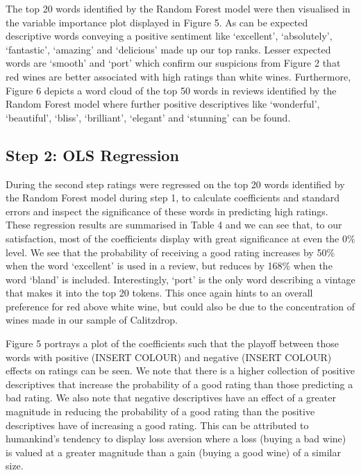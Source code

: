 \documentclass[11pt,preprint]{elsarticle}
\numberwithin{equation}{section}
\numberwithin{figure}{section}
\numberwithin{table}{section}
\begin{document}
The top 20 words identified by the Random Forest model were then
visualised in the variable importance plot displayed in Figure 5. As can
be expected descriptive words conveying a positive sentiment like
`excellent', `absolutely', `fantastic', `amazing' and `delicious' made
up our top ranks. Lesser expected words are `smooth' and `port' which
confirm our suspicions from Figure 2 that red wines are better
associated with high ratings than white wines. Furthermore, Figure 6
depicts a word cloud of the top 50 words in reviews identified by the
Random Forest model where further positive descriptives like
`wonderful', `beautiful', `bliss', `brilliant', `elegant' and `stunning'
can be found.

\subsection{Step 2: OLS Regression}\label{step-2-ols-regression}

During the second step ratings were regressed on the top 20 words
identified by the Random Forest model during step 1, to calculate
coefficients and standard errors and inspect the significance of these
words in predicting high ratings. These regression results are
summarised in Table 4 and we can see that, to our satisfaction, most of
the coefficients display with great significance at even the 0\% level.
We see that the probability of receiving a good rating increases by 50\%
when the word `excellent' is used in a review, but reduces by 168\% when
the word `bland' is included. Interestingly, `port' is the only word
describing a vintage that makes it into the top 20 tokens. This once
again hints to an overall preference for red above white wine, but could
also be due to the concentration of wines made in our sample of
Calitzdrop.

Figure 5 portrays a plot of the coefficients such that the playoff
between those words with positive (INSERT COLOUR) and negative (INSERT
COLOUR) effects on ratings can be seen. We note that there is a higher
collection of positive descriptives that increase the probability of a
good rating than those predicting a bad rating. We also note that
negative descriptives have an effect of a greater magnitude in reducing
the probability of a good rating than the positive descriptives have of
increasing a good rating. This can be attributed to humankind's tendency
to display loss aversion where a loss (buying a bad wine) is valued at a
greater magnitude than a gain (buying a good wine) of a similar size.
\end{document}
